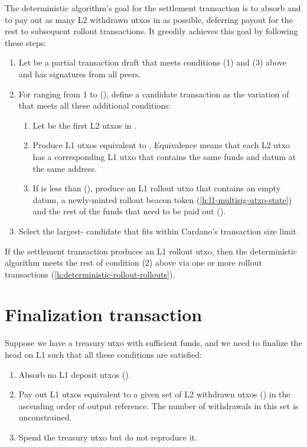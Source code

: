 \documentclass[../hydrozoa.tex]{subfiles}
\begin{document}
The deterministic algorithm's goal for the settlement transaction is to absorb  and to pay out as many L2 withdrawn utxos in  as possible, deferring payout for the rest to subsequent rollout transactions.
It greedily achieves this goal by following these steps:
\begin{enumerate}
  \item Let  be a partial transaction draft that meets conditions (1) and (3) above and has signatures from all peers.
  \item For  ranging from 1 to (), define a candidate transaction as the variation of  that meets all these additional conditions:
    \begin{enumerate}
      \item Let  be the first  L2 utxos in .
      \item Produce L1 utxos equivalent to .
        Equivalence means that each L2 utxo has a corresponding L1 utxo that contains the same funds and datum at the same address.
      \item If  is less than (), produce an L1 rollout utxo that contains an empty datum, a newly-minted rollout beacon token (\cref{h:l1-multisig-utxo-state}) and the rest of the funds that need to be paid out
        ().
    \end{enumerate}
  \item Select the largest- candidate that fits within Cardano's transaction size limit.
\end{enumerate}

If the settlement transaction produces an L1 rollout utxo, then the deterministic algorithm meets the rest of condition (2) above via one or more rollout transactions (\cref{h:deterministic-rollout-rollouts}).

\section{Finalization transaction}%
\label{h:deterministic-rollout-finalization}%

Suppose we have a treasury utxo with sufficient funds, and we need to finalize the head on L1 such that all these conditions are satisfied:
\begin{enumerate}
  \item Absorb no L1 deposit utxos ().
  \item Pay out L1 utxos equivalent to a given set of L2 withdrawn utxos () in the ascending order of output reference.
    The number of withdrawals in this set is unconstrained.
  \item Spend the treasury utxo but do not reproduce it.
\end{enumerate}
\end{document}
